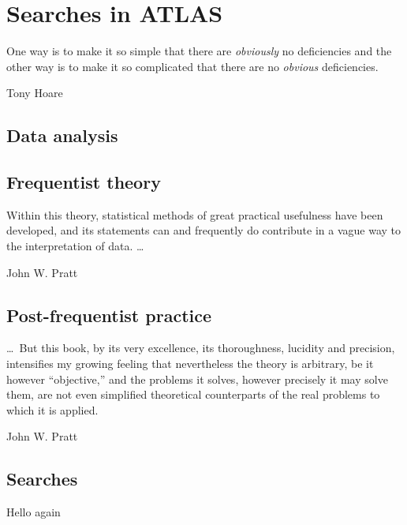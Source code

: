 \chapter{Searches in ATLAS}
\label{chapter:intro}

\epigraph{%
One way is to make it so simple that there are \emph{obviously} no deficiencies and the other way is to make it so complicated that there are
no \emph{obvious} deficiencies.%
}%
{Tony Hoare~\cite{hoare2007emperor}}



\section{Data analysis}

\section{Frequentist theory}

\epigraph{%
Within this theory, statistical methods of great practical usefulness have been
developed, and its statements can and frequently do contribute in a vague way
to the interpretation of data. \ldots%
}%
{John W. Pratt~\cite{pratt1961testing}}


\section{Post-frequentist practice}

\epigraph{%
\ldots\ But this book, by its very excellence, its thoroughness, lucidity and
precision, intensifies my growing feeling that nevertheless the theory is
arbitrary, be it however ``objective,'' and the problems it solves, however
precisely it may solve them, are not even simplified theoretical counterparts
of the real problems to which it is applied.%
}%
{John W. Pratt~\cite{pratt1961testing}}


\section{Searches}

\clearpage

Hello again
